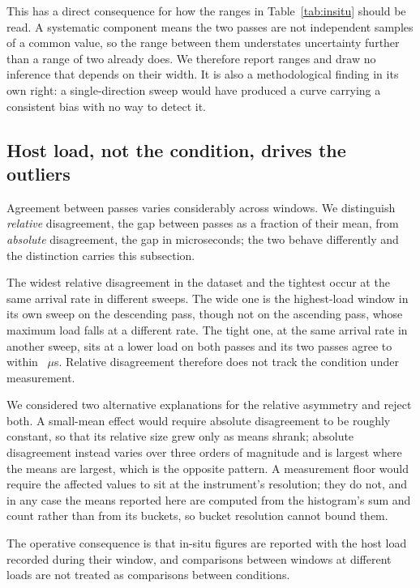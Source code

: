 \documentclass[pdflatex,sn-basic,twocolumn]{sn-jnl}%
\begin{document}
This has a direct consequence for how the ranges in Table~\ref{tab:insitu} should
be read. A systematic component means the two passes are not independent samples
of a common value, so the range between them understates uncertainty further than
a range of two already does. We therefore report ranges and draw no inference that
depends on their width. It is also a methodological finding in its own right: a
single-direction sweep would have produced a curve carrying a consistent bias with
no way to detect it.

\subsection{Host load, not the condition, drives the outliers}\label{sec:load}

Agreement between passes varies considerably across windows. We distinguish
\emph{relative} disagreement, the gap between passes as a fraction of their mean,
from \emph{absolute} disagreement, the gap in microseconds; the two behave
differently and the distinction carries this subsection.

The widest relative disagreement in the dataset and the tightest occur at the same
arrival rate in different sweeps. The wide one is the highest-load window in its
own sweep on the descending pass, though not on the ascending pass, whose maximum
load falls at a different rate. The tight one, at the same arrival rate in another
sweep, sits at a lower load on both passes and its two passes agree to within
\InsituTightestAgreement~$\mu$s. Relative disagreement therefore does not track
the condition under measurement.

We considered two alternative explanations for the relative asymmetry and reject
both. A small-mean effect would require absolute disagreement to be roughly
constant, so that its relative size grew only as means shrank; absolute
disagreement instead varies over three orders of magnitude and is largest where
the means are largest, which is the opposite pattern. A measurement floor would
require the affected values to sit at the instrument's resolution; they do not,
and in any case the means reported here are computed from the histogram's sum and
count rather than from its buckets, so bucket resolution cannot bound them.

The operative consequence is that in-situ figures are reported with the host load
recorded during their window, and comparisons between windows at different loads
are not treated as comparisons between conditions.
\end{document}

